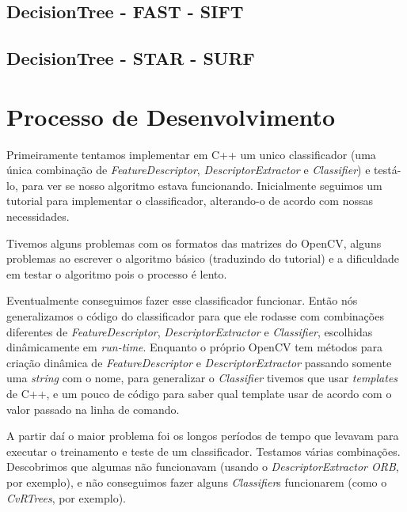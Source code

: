 \subsection{DecisionTree - FAST - SIFT}


\subsection{DecisionTree - STAR - SURF}
  



\section{Processo de Desenvolvimento}
Primeiramente tentamos implementar em C++ um unico classificador (uma única combinação de
\textit{FeatureDescriptor}, \textit{DescriptorExtractor} e \textit{Classifier})
e testá-lo, para ver se nosso algoritmo estava funcionando. Inicialmente seguimos um tutorial
para implementar o classificador, alterando-o de acordo com nossas necessidades.

Tivemos alguns problemas com os formatos das matrizes do OpenCV, alguns problemas ao escrever
o algoritmo básico (traduzindo do tutorial) e a dificuldade em testar o algoritmo pois o
processo é lento.

Eventualmente conseguimos fazer esse classificador funcionar. Então nós generalizamos o código do
classificador para que ele rodasse com combinações diferentes de \textit{FeatureDescriptor}, 
\textit{DescriptorExtractor} e \textit{Classifier}, escolhidas dinâmicamente em \textit{run-time}.
Enquanto o próprio OpenCV tem métodos para criação dinâmica de \textit{FeatureDescriptor} e 
\textit{DescriptorExtractor} passando somente uma \textit{string} com o nome, para generalizar o
\textit{Classifier} tivemos que usar \textit{templates} de C++, e um pouco de código para saber
qual template usar de acordo com o valor passado na linha de comando.

A partir daí o maior problema foi os longos períodos de tempo que levavam para executar o treinamento
e teste de um classificador. Testamos várias combinações. Descobrimos que algumas não funcionavam
(usando o \textit{DescriptorExtractor ORB}, por exemplo), e não conseguimos fazer alguns 
\textit{Classifier}s funcionarem (como o \textit{CvRTrees}, por exemplo).

